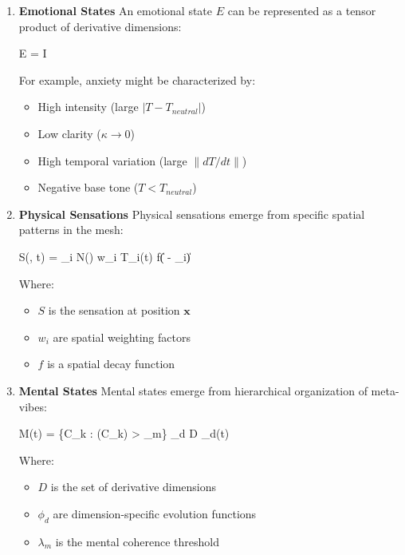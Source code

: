 \documentclass{article}
\let\oldequation\equation
\let\endoldequation\endequation
\renewenvironment{equation}{%
    \noindent\vspace{-\parskip}\vspace{-\baselineskip}%
    \oldequation
}{%
    \endoldequation
    \noindent\vspace{-\parskip}\vspace{-\baselineskip}%
}
\theoremstyle{definition}
\begin{document}
\begin{enumerate}
\item \textbf{Emotional States} An emotional state $E$ can be represented as a tensor product of derivative dimensions:

\begin{equation}
E = I \otimes \kappa \otimes \Xi \otimes {}
\end{equation}

For example, anxiety might be characterized by:
\begin{itemize}
\item High intensity (large $|T - T_{neutral}|$)
\item Low clarity ($\kappa \to 0$)
\item High temporal variation (large $\|dT/dt\|$)
\item Negative base tone ($T < T_{neutral}$)
\end{itemize}

\item \textbf{Physical Sensations} Physical sensations emerge from specific spatial patterns in the mesh:

\begin{equation}
S(, t) = \sum_{i \in N()} w_i T_i(t) f(\| - _i\|)
\end{equation}

Where:
\begin{itemize}
\item $S$ is the sensation at position $\mathbf{x}$
\item $w_i$ are spatial weighting factors
\item $f$ is a spatial decay function
\end{itemize}

\item \textbf{Mental States} Mental states emerge from hierarchical organization of meta-vibes:

\begin{equation}
M(t) = \{C_k : (C_k) > \lambda_m\} \times \prod_{d \in D} \phi_d(t)
\end{equation}

Where:
\begin{itemize}
\item $D$ is the set of derivative dimensions
\item $\phi_d$ are dimension-specific evolution functions
\item $\lambda_m$ is the mental coherence threshold
\end{itemize}
\end{enumerate}
\end{document}

